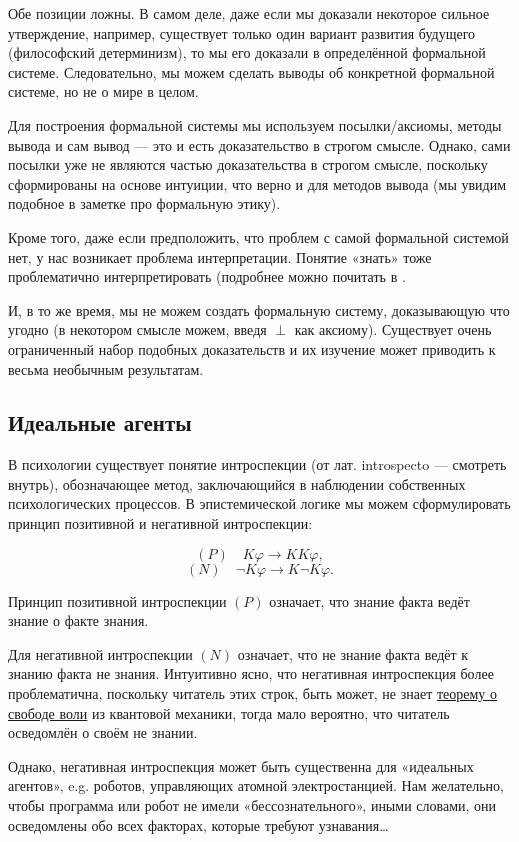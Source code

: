 \documentclass[openany]{book}
\theoremstyle{plain}
\theoremstyle{definition}
\begin{document}
Обе позиции ложны. В самом деле, даже если мы доказали некоторое сильное утверждение, например, существует только один вариант развития будущего (философский детерминизм), то мы его доказали в определённой формальной системе. Следовательно, мы можем сделать выводы об конкретной формальной системе, но не о мире в целом.

Для построения формальной системы мы используем посылки/аксиомы, методы вывода и сам вывод — это и есть доказательство в строгом смысле. Однако, сами посылки уже не являются частью доказательства в строгом смысле, поскольку сформированы на основе интуиции, что верно и для методов вывода (мы увидим подобное в заметке про формальную этику).

Кроме того, даже если предположить, что проблем с самой формальной системой нет, у нас возникает проблема интерпретации. Понятие «знать» тоже проблематично интерпретировать (подробнее можно почитать в \cite{Lewis}.

И, в то же время, мы не можем создать формальную систему, доказывающую что угодно (в некотором смысле можем, введя \(\perp\) как аксиому). Существует очень ограниченный набор подобных доказательств и их изучение может приводить к весьма необычным результатам.

\subsection{Идеальные агенты}

В психологии существует понятие интроспекции (от лат. introspecto — смотреть внутрь), обозначающее метод, заключающийся в наблюдении собственных психологических процессов. В эпистемической логике мы можем сформулировать принцип позитивной и негативной интроспекции:

\[(P) \quad K \varphi \to K K \varphi,\]
\[(N) \quad \neg K \varphi \to K \neg K \varphi.\]

Принцип позитивной интроспекции \((P)\) означает, что знание факта ведёт знание о факте знания.

Для негативной интроспекции \((N)\) означает, что не знание факта ведёт к знанию факта не знания. Интуитивно ясно, что негативная интроспекция более проблематична, поскольку читатель этих строк, быть может, не знает \href{https://ru.wikipedia.org/wiki/Теорема_о_свободе_воли}{теорему о свободе воли} из квантовой механики, тогда мало вероятно, что читатель осведомлён о своём не знании. 

Однако, негативная интроспекция может быть существенна для «идеальных агентов», e.g. роботов, управляющих атомной электростанцией. Нам желательно, чтобы программа или робот не имели «бессознательного», иными словами, они осведомлены обо всех факторах, которые требуют узнавания\dots
\end{document}
